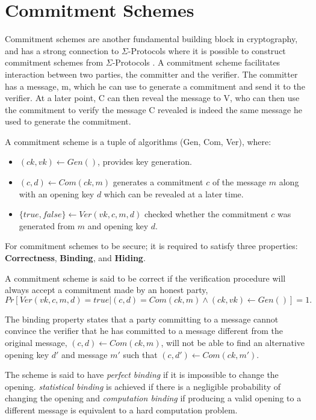 \section{Commitment Schemes}
\label{sec:background:commitment}
Commitment schemes are another fundamental building block in cryptography, and
has a strong connection to $\Sigma$-Protocols where it is possible to construct
commitment schemes from $\Sigma$-Protocols \cite{cryptoeprint:2019:1185}.
A commitment scheme facilitates interaction between two parties, the committer
and the verifier.
The committer has a message, m, which he can use to generate a commitment and
send it to the verifier.
At a later point, C can then reveal the message
to V, who can then use the commitment to verify the message C revealed is indeed
the same message he used to generate the commitment.

\begin{definition}
A commitment scheme is a tuple of algorithms (Gen, Com, Ver), where:
\begin{itemize}
  \item $(ck, vk) \leftarrow Gen()$, provides key generation.
  \item $(c, d) \leftarrow Com(ck, m)$ generates a commitment $c$ of the message
    $m$ along with an opening key $d$ which can be revealed at a later time.
  \item $\{true, false\} \leftarrow Ver(vk, c, m, d)$ checked whether the
    commitment $c$ was generated from $m$ and opening key $d$.
\end{itemize}
\end{definition}

For commitment schemes to be secure; it is required to satisfy three
properties: \textbf{Correctness}, \textbf{Binding}, and \textbf{Hiding}.

\begin{definition}[correctness]
  A commitment scheme is said to be correct if
  the verification procedure  will always accept a commitment made by an honest party,
 \ie
$$
Pr[Ver(vk, c, m, d) = true | (c, d) = Com(ck, m) \land (ck, vk) \leftarrow Gen()] = 1.
$$
\end{definition}

\begin{definition}[binding]
The binding property states that a party committing to a message cannot
convince the verifier that he has committed to a message different from the
original message, \ie $(c, d) \leftarrow Com(ck, m)$, will
not be able to find an alternative opening key $d'$ and message $m'$ such that
$(c, d') \leftarrow Com(ck, m')$.

The scheme is said to have \textit{perfect binding} if it is impossible to change the
opening.
\textit{statistical binding} is achieved if there is a negligible probability of changing
the opening and \textit{computation binding} if producing a valid opening to a
different message is equivalent to a hard computation problem.
\end{definition}

